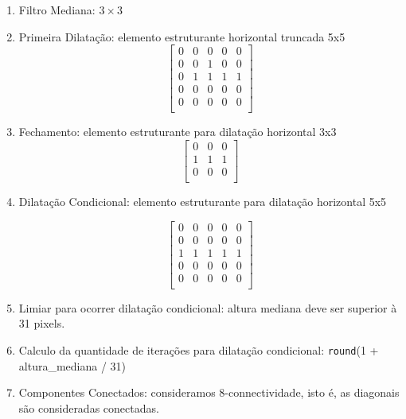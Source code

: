 \documentclass[english, 
               brazil, 
               bsc] %
               {dcomp-abntex2}
\begin{document}
\begin{enumerate}
  \item Filtro Mediana: $3 \times 3$
  \item Primeira Dilatação: elemento estruturante horizontal truncada 5x5
\[
\begin{bmatrix}
0 & 0 & 0 & 0 & 0 \\
0 & 0 & 1 & 0 & 0 \\
0 & 1 & 1 & 1 & 1 \\
0 & 0 & 0 & 0 & 0 \\
0 & 0 & 0 & 0 & 0 \\
\end{bmatrix}
\]
  \item Fechamento: elemento estruturante para dilatação horizontal 3x3
\[
\begin{bmatrix}
0 & 0 & 0 \\
1 & 1 & 1 \\
0 & 0 & 0 \\
\end{bmatrix}
\]

  \item Dilatação Condicional: elemento estruturante para dilatação horizontal 5x5

\[
\begin{bmatrix}
0 & 0 & 0 & 0 & 0 \\
0 & 0 & 0 & 0 & 0 \\
1 & 1 & 1 & 1 & 1 \\
0 & 0 & 0 & 0 & 0 \\
0 & 0 & 0 & 0 & 0 \\
\end{bmatrix}
\]
       
\item Limiar para ocorrer dilatação condicional: altura mediana deve ser superior à 31 pixels.

\item Calculo da quantidade de iterações para dilatação condicional: \texttt{round}(1 + altura\_mediana / 31)

\item Componentes Conectados: consideramos 8-connectividade, isto é, as diagonais são consideradas conectadas.

\end{enumerate}


\end{document}
